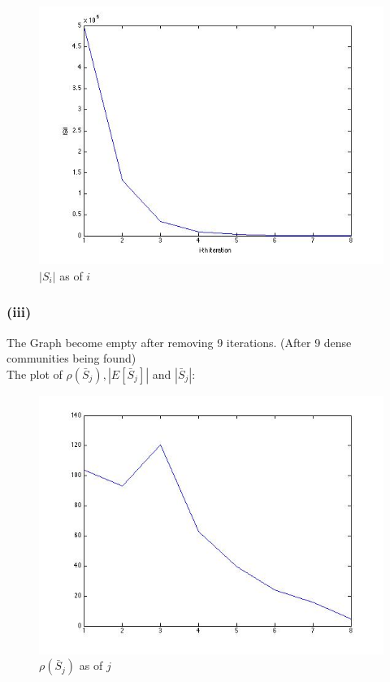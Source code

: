 \documentclass{article}
\begin{document}
\begin{figure}[H]
\centering
\includegraphics[scale=0.5]{q4-Si.jpg}
\caption{ $|S_i|$ as of $i$ }
\label{}
\end{figure}

\subsubsection{(iii)}
The Graph become empty after removing 9 iterations. (After 9 dense communities being found) \\
The plot of $\rho(\bar S_j), |E[\bar S_j]|$ and $|\bar S_j|$: \\

\begin{figure}[H]
\centering
\includegraphics[scale=0.5]{q4c-rho.jpg}
\caption{ $\rho(\bar S_j)$ as of $j$}
\label{}
\end{figure}
\end{document}
